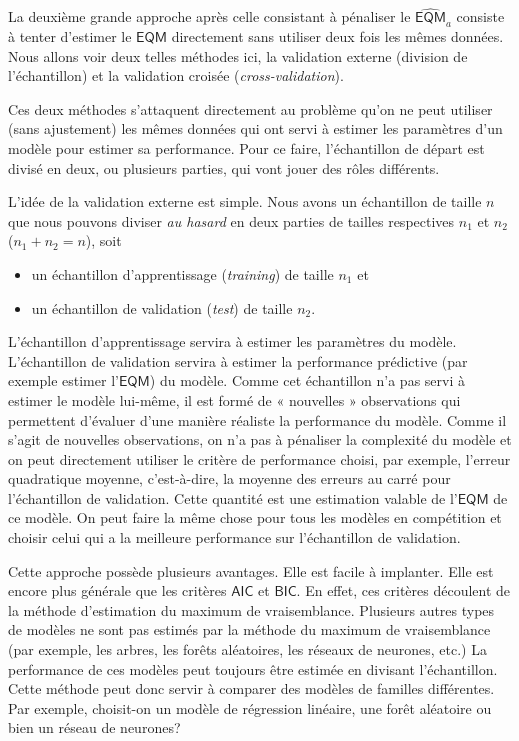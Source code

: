 \documentclass[
  11pt,
  letterpaper,
]{scrbook}
\providecommand{\tightlist}{%
  \setlength{\itemsep}{0pt}\setlength{\parskip}{0pt}}\usepackage{longtable,booktabs,array}
\theoremstyle{definition}
\theoremstyle{remark}
\begin{document}
La deuxième grande approche après celle consistant à pénaliser le
\(\widehat{\mathsf{EQM}}_a\) consiste à tenter d'estimer le
\(\mathsf{EQM}\) directement sans utiliser deux fois les mêmes données.
Nous allons voir deux telles méthodes ici, la validation externe
(division de l'échantillon) et la validation croisée
(\emph{cross-validation}).

Ces deux méthodes s'attaquent directement au problème qu'on ne peut
utiliser (sans ajustement) les mêmes données qui ont servi à estimer les
paramètres d'un modèle pour estimer sa performance. Pour ce faire,
l'échantillon de départ est divisé en deux, ou plusieurs parties, qui
vont jouer des rôles différents.

L'idée de la validation externe est simple. Nous avons un échantillon de
taille \(n\) que nous pouvons diviser \emph{au hasard} en deux parties
de tailles respectives \(n_1\) et \(n_2\) (\(n_1+n_2=n\)), soit

\begin{itemize}
\tightlist
\item
  un échantillon d'apprentissage (\emph{training}) de taille \(n_1\) et
\item
  un échantillon de validation (\emph{test}) de taille \(n_2\).
\end{itemize}

L'échantillon d'apprentissage servira à estimer les paramètres du
modèle. L'échantillon de validation servira à estimer la performance
prédictive (par exemple estimer l'\(\mathsf{EQM}\)) du modèle. Comme cet
échantillon n'a pas servi à estimer le modèle lui-même, il est formé de
« nouvelles » observations qui permettent d'évaluer d'une manière
réaliste la performance du modèle. Comme il s'agit de nouvelles
observations, on n'a pas à pénaliser la complexité du modèle et on peut
directement utiliser le critère de performance choisi, par exemple,
l'erreur quadratique moyenne, c'est-à-dire, la moyenne des erreurs au
carré pour l'échantillon de validation. Cette quantité est une
estimation valable de l'\(\mathsf{EQM}\) de ce modèle. On peut faire la
même chose pour tous les modèles en compétition et choisir celui qui a
la meilleure performance sur l'échantillon de validation.

Cette approche possède plusieurs avantages. Elle est facile à implanter.
Elle est encore plus générale que les critères \(\mathsf{AIC}\) et
\(\mathsf{BIC}\). En effet, ces critères découlent de la méthode
d'estimation du maximum de vraisemblance. Plusieurs autres types de
modèles ne sont pas estimés par la méthode du maximum de vraisemblance
(par exemple, les arbres, les forêts aléatoires, les réseaux de
neurones, etc.) La performance de ces modèles peut toujours être estimée
en divisant l'échantillon. Cette méthode peut donc servir à comparer des
modèles de familles différentes. Par exemple, choisit-on un modèle de
régression linéaire, une forêt aléatoire ou bien un réseau de neurones?
\end{document}
